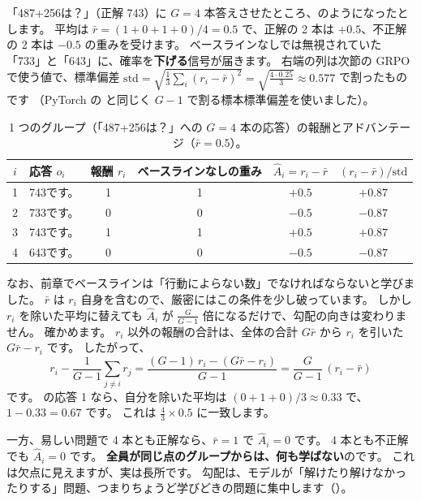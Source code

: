 \begin{example}[グループのアドバンテージを手で計算する]
「487+256は？」（正解 743）に $G=4$ 本答えさせたところ、のようになったとします。
平均は $\bar r=(1+0+1+0)/4=0.5$ で、正解の 2 本は $+0.5$、不正解の 2 本は $-0.5$ の重みを受けます。
ベースラインなしでは無視されていた「733」と「643」に、確率を\textbf{下げる}信号が届きます。
右端の列は次節の GRPO で使う値で、標準偏差 $\mathrm{std}=\sqrt{\tfrac{1}{3}\sum_i(r_i-\bar r)^2}=\sqrt{\tfrac{4\cdot0.25}{3}}\approx0.577$ で割ったものです
（PyTorch の  と同じく $G-1$ で割る標本標準偏差を使いました）。
\end{example}

\begin{table}[tbp]
\centering
\caption{1 つのグループ（「487+256は？」への $G=4$ 本の応答）の報酬とアドバンテージ（$\bar r=0.5$）。}
\label{tab:rl-adv-example}
\small
\begin{tabular}{clcccc}
\toprule
$i$ & 応答 $o_i$ & 報酬 $r_i$ & ベースラインなしの重み & $\hat A_i=r_i-\bar r$ & $(r_i-\bar r)/\mathrm{std}$ \\
\midrule
1 & 743です。 & 1 & 1 & $+0.5$ & $+0.87$ \\
2 & 733です。 & 0 & 0 & $-0.5$ & $-0.87$ \\
3 & 743です。 & 1 & 1 & $+0.5$ & $+0.87$ \\
4 & 643です。 & 0 & 0 & $-0.5$ & $-0.87$ \\
\bottomrule
\end{tabular}
\end{table}

なお、前章でベースラインは「行動によらない数」でなければならないと学びました。
$\bar r$ は $r_i$ 自身を含むので、厳密にはこの条件を少し破っています。
しかし $r_i$ を除いた平均に替えても $\hat A_i$ が $\frac{G}{G-1}$ 倍になるだけで、勾配の向きは変わりません。
確かめます。
$r_i$ 以外の報酬の合計は、全体の合計 $G\bar r$ から $r_i$ を引いた $G\bar r-r_i$ です。
したがって、
\begin{equation*}
r_i-\frac{1}{G-1}\sum_{j\ne i}r_j
=\frac{(G-1)\,r_i-(G\bar r-r_i)}{G-1}
=\frac{G}{G-1}\,(r_i-\bar r)
\end{equation*}
です。
の応答 1 なら、自分を除いた平均は $(0+1+0)/3\approx0.33$ で、$1-0.33=0.67$ です。
これは $\frac{4}{3}\times0.5$ に一致します。

一方、易しい問題で 4 本とも正解なら、$\bar r=1$ で $\hat A_i=0$ です。
4 本とも不正解でも $\hat A_i=0$ です。
\textbf{全員が同じ点のグループからは、何も学ばない}のです。
これは欠点に見えますが、実は長所です。
勾配は、モデルが「解けたり解けなかったりする」問題、つまりちょうど学びどきの問題に集中します（）。


